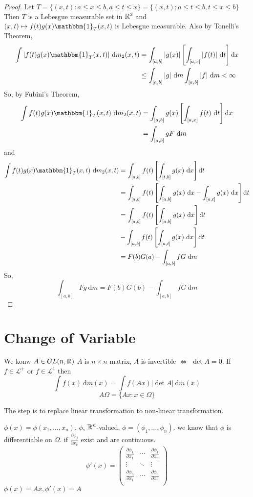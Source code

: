 \begin{proof}
  Let $T = \{(x, t) : a \le x \le b, a \le t \le x\} = \{(x, t) : a \le t \le b, t \le x \le b\}$
  Then $T$ is a Lebesgue measurable set in $\mathbb R^2$ and $(x, t) \mapsto f(t)g(x) \mathbbm{1}_T(x, t)$ is Lebesgue measurable. 
  Also by Tonelli's Theorem, 
  \begin{align*}
    \int |f(t)g(x) \mathbbm{1}_T(x, t)| \ \mathrm{d}m_2(x, t) &= \int_{[a, b]} |g(x)|\left[\int_{[a, x]}|f(t)|\ \mathrm{d}t\right] \mathrm{d}x \\
    &\le \int_{[a, b]} |g| \ \mathrm{d}m \int_{[a, b]} |f| \ \mathrm{d}m < \infty
  \end{align*}
  So, by Fubini's Theorem,
  \begin{align*}
    \int f(t) g(x) \mathbbm{1}_T(x, t) \ \mathrm{d}m_2(x, t) &= \int_{[a, b]}g(x) \left[\int_{[a, x]} f(t) \ \mathrm{d}t\right] \mathrm{d}x \\
    &= \int_{[a, b]} gF \ \mathrm{d}m
  \end{align*}
  and 
  \begin{align*}
    \int f(t)g(x)\mathbbm{1}_T(x, t) \ \mathrm{d}m_2(x, t) &= \int_{[a, b]} f(t) \left[\int_{[t, b]} g(x) \ \mathrm{d}x\right] \mathrm{d}t \\
    &= \int_{[a, b]} f(t) \left[\int_{[a, b]} g(x) \ \mathrm{d}x - \int_{[a, t]} g(x) \ \mathrm{d}x\right]\mathrm{d}t \\
    &= \int_{[a, b]} f(t) \left[ \int_{[a, b]} g(x) \ \mathrm{d}x \right]\mathrm{d}t \\
    &- \int_{[a, b]} f(t) \left[ \int_{[a, t]} g(x) \ \mathrm{d}x \right]\mathrm{d}t \\
    &= F(b)G(a) - \int_{[a, b]} fG \ \mathrm{d}m 
  \end{align*}
  So,
  \[\int_{[a, b]} Fg \ \mathrm{d}m = F(b)G(b) - \int_{[a, b]} fG \ \mathrm{d}m\]
\end{proof}

\section{Change of Variable}
We konw $A \in GL(n, \mathbb R)$ $A$ is $n \times n$ matrix, $A$ is invertible $\iff$ $\det A = 0$.
If $f \in \mathcal{L}^+$ or $f \in \mathcal{L}^1$ then
\[\int f(x) \ \mathrm{d}m(x) = \int f(Ax) |\det A| \ \mathrm{d}m(x)\]
\[A \Omega = \{Ax : x \in \Omega\}\]

The step is to replace linear transformation to non-linear transformation.

$\phi(x) = \phi(x_1, \dotsc, x_n)$, $\phi$, $\mathbb R^n$-valued, $\phi = (\phi_1, \dotsc, \phi_n)$.
we know that $\phi$ is differentiable on $\Omega$. if $\frac{\partial \phi_j}{\partial x_k}$ exist and are continuous. 
\[\phi'(x) = \begin{pmatrix}
  \frac{\partial \phi_1}{\partial x_1} & \dotsm & \frac{\partial \phi_1}{\partial x_n} \\
  \vdots & \ddots & \vdots \\
  \frac{\partial \phi_n}{\partial x_1} & \dotsm & \frac{\partial \phi_n}{\partial x_n} \\
\end{pmatrix}\]
$\phi(x) = Ax, \phi'(x) = A$


